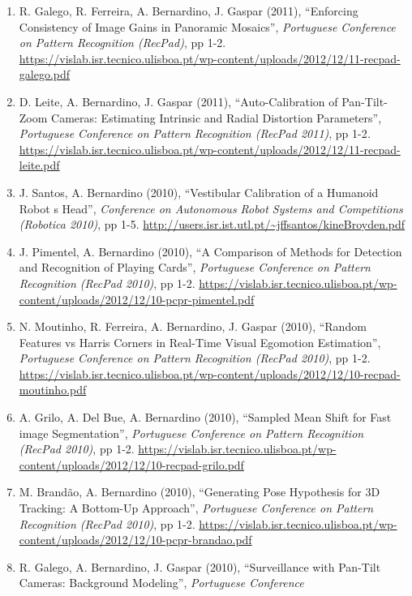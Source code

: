 \documentclass[
]{article}
\begin{document}
\begin{enumerate}
  \emph{Portuguese Conference on Pattern Recognition (RecPad)}, pp 1-2.
\item
  R. Galego, R. Ferreira, A. Bernardino, J. Gaspar (2011), ``Enforcing
  Consistency of Image Gains in Panoramic Mosaics'', \emph{Portuguese
  Conference on Pattern Recognition (RecPad)}, pp 1-2.
  \url{https://vislab.isr.tecnico.ulisboa.pt/wp-content/uploads/2012/12/11-recpad-galego.pdf}
\item
  D. Leite, A. Bernardino, J. Gaspar (2011), ``Auto-Calibration of
  Pan-Tilt-Zoom Cameras: Estimating Intrinsic and Radial Distortion
  Parameters'', \emph{Portuguese Conference on Pattern Recognition
  (RecPad 2011)}, pp 1-2\emph{.}
  \url{https://vislab.isr.tecnico.ulisboa.pt/wp-content/uploads/2012/12/11-recpad-leite.pdf}
\item
  J. Santos, A. Bernardino (2010), ``Vestibular Calibration of a
  Humanoid Robot\textquotesingle{} s Head'', \emph{Conference on
  Autonomous Robot Systems and Competitions (Robotica 2010)}, pp 1-5.
  \url{http://users.isr.ist.utl.pt/~jffsantos/kineBroyden.pdf}
\item
  J. Pimentel, A. Bernardino (2010), ``A Comparison of Methods for
  Detection and Recognition of Playing Cards'', \emph{Portuguese
  Conference on Pattern Recognition (RecPad 2010)}, pp 1-2.
  \url{https://vislab.isr.tecnico.ulisboa.pt/wp-content/uploads/2012/12/10-pcpr-pimentel.pdf}
\item
  N. Moutinho, R. Ferreira, A. Bernardino, J. Gaspar (2010), ``Random
  Features vs Harris Corners in Real-Time Visual Egomotion Estimation'',
  \emph{Portuguese Conference on Pattern Recognition (RecPad 2010)}, pp
  1-2.
  \url{https://vislab.isr.tecnico.ulisboa.pt/wp-content/uploads/2012/12/10-recpad-moutinho.pdf}
\item
  A. Grilo, A. Del Bue, A. Bernardino (2010), ``Sampled Mean Shift for
  Fast image Segmentation'', \emph{Portuguese Conference on Pattern
  Recognition (RecPad 2010)}, pp 1-2.
  \url{https://vislab.isr.tecnico.ulisboa.pt/wp-content/uploads/2012/12/10-recpad-grilo.pdf}
\item
  M. Brandão, A. Bernardino (2010), ``Generating Pose Hypothesis for 3D
  Tracking: A Bottom-Up Approach'', \emph{Portuguese Conference on
  Pattern Recognition (RecPad 2010)}, pp 1-2.
  \url{https://vislab.isr.tecnico.ulisboa.pt/wp-content/uploads/2012/12/10-pcpr-brandao.pdf}
\item
  R. Galego, A. Bernardino, J. Gaspar (2010), ``Surveillance with
  Pan-Tilt Cameras: Background Modeling'', \emph{Portuguese Conference
}
\end{enumerate}
\end{document}
